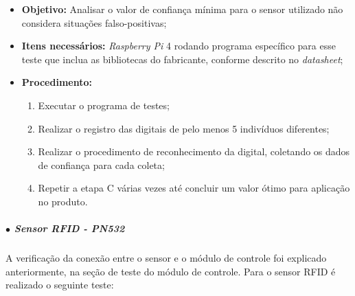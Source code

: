 \begin{enumerate}
    \begin{itemize}
        \item \textbf{Objetivo:} Analisar o valor de confiança mínima para o sensor utilizado não considera situações falso-positivas;
        \item \textbf{Itens necessários:} \textit{Raspberry Pi} 4 rodando programa específico para esse teste que inclua as bibliotecas do fabricante, conforme descrito no \textit{datasheet};
        \item \textbf{Procedimento:} 
        \begin{enumerate}
            \item Executar o programa de testes;
            \item Realizar o registro das digitais de pelo menos 5 indivíduos diferentes;
            \item Realizar o procedimento de reconhecimento da digital, coletando os dados de confiança para cada coleta;
            \item Repetir a etapa C várias vezes até concluir um valor ótimo para aplicação no produto.
        \end{enumerate}
    \end{itemize}
\end{enumerate}

\subparagraph*{$\bullet$ Sensor RFID - PN532} \hfill

A verificação da conexão entre o sensor e o módulo de controle foi explicado anteriormente, na seção de teste do módulo de controle. Para o sensor RFID é realizado o seguinte teste:


